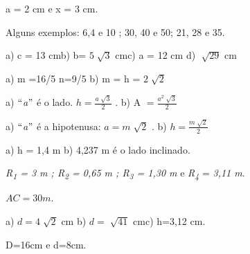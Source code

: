 \begin{respostas}{3}

\ansitem{} a = 2 cm e x = 3 cm.

\ansitem{} Alguns exemplos: 6,4 e 10 ;  30, 40 e 50;  21, 28 e 35.

\ansitem{} a) \tab c = 13 cm\tab b) b= \( 5\sqrt[]{3} \) \tab cm\tab c) a = 12 cm   \tab d)  \( \sqrt[]{29} \)  cm

\ansitem{} a) m =16/5  n=9/5       \tab  b)   m = h =  \( 2\sqrt[]{2} \)

\ansitem{} a) $``$\textit{a}$"$  é o lado.  \( h=\frac{a\sqrt[]{3}}{2} \) .    \tab b) A \( =\frac{a^{2}\sqrt[]{3}}{2} \)

\ansitem{} a) $``$\textit{a}$"$  é a hipotenusa:  \( a=m\sqrt[]{2} \) .     \tab b)  \( h=\frac{m\sqrt[]{2}}{2} \)

\ansitem{} a) h = 1,4 m   \tab \tab \tab \tab    b) 4,237 m é o lado inclinado.  

\ansitem{}  \textit{R\textsubscript{1} = 3 m ;  R\textsubscript{2} = 0,65 m ; R\textsubscript{3}  = 1,30 m   }e\textit{  R\textsubscript{4}} = \textit{3,11 m}.


\ansitem{}  \( AC=30 m.  \)

\ansitem{} a)  \( d=4\sqrt[]{2} \)   cm  \tab b)  \( d=\sqrt[]{41} \)  cm\tab c) h=3,12 cm.

\ansitem{} D=16cm  e \tab d=8cm.
\end{respostas}

